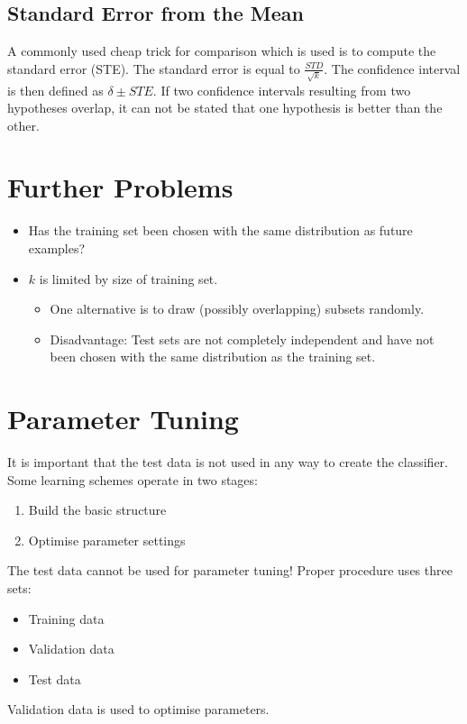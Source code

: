 \documentclass[11pt]{article}
\begin{document}
\subsection{Standard Error from the Mean}
\label{sec:org6da8db4}
A commonly used cheap trick for comparison which is used is to compute the standard error (STE).
The standard error is equal to \(\frac{STD}{\sqrt{k}}\).
The confidence interval is then defined as \(\delta \pm STE\).
If two confidence intervals resulting from two hypotheses overlap, it can not be stated that one hypothesis is better than the other.
\section{Further Problems}
\label{sec:org995b75d}
\begin{itemize}
\item Has the training set been chosen with the same distribution as future examples?
\item \(k\) is limited by size of training set.
\begin{itemize}
\item One alternative is to draw (possibly overlapping) subsets randomly.
\item Disadvantage: Test sets are not completely independent and have not been chosen with the same distribution as the training set.
\end{itemize}
\end{itemize}

\section{Parameter Tuning}
\label{sec:org0201055}
It is important that the test data is not used in any way to create the classifier.
Some learning schemes operate in two stages:
\begin{enumerate}
\item Build the basic structure
\item Optimise parameter settings
\end{enumerate}
The test data cannot be used for parameter tuning!
Proper procedure uses three sets: 
\begin{itemize}
\item Training data
\item Validation data
\item Test data
\end{itemize}
Validation data is used to optimise parameters.
\end{document}
